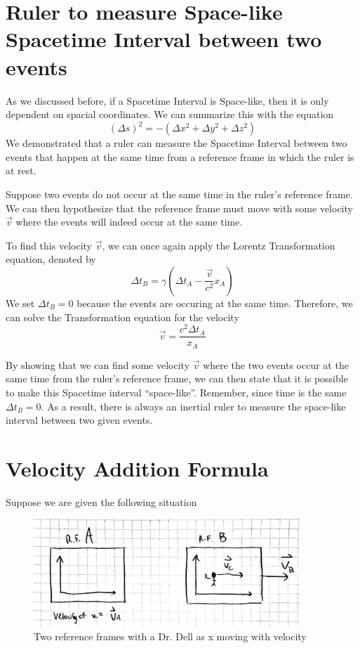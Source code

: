 \documentclass{article}
\begin{document}
\section{Ruler to measure Space-like Spacetime Interval between two events}
As we discussed before, if a Spacetime Interval is Space-like, then it is only dependent on spacial coordinates. We can summarize this with the equation
\[
  (\Delta s)^2 = -(\Delta x^2 + \Delta y^2 + \Delta z^2)
\]
We demonstrated that a ruler can measure the Spacetime Interval between two events that happen at the same time from a reference frame in which the ruler is at rest.

Suppose two events do not occur at the same time in the ruler's reference frame. We can then hypothesize that the reference frame must move with some velocity \(\vec{v}\) where the events will indeed occur at the same time.

To find this velocity \(\vec{v}\), we can once again apply the Lorentz Transformation equation, denoted by
\[
  \Delta t_B = \gamma (\Delta t_A - \frac{\vec{v}}{c^2} x_A)
\]
We set \(\Delta t_B = 0\) because the events are occuring at the same time. Therefore, we can solve the Transformation equation for the velocity
\[
  \vec{v} = \frac{c^2 \Delta t_A}{x_A}
\]

By showing that we can find some velocity \(\vec{v}\) where the two events occur at the same time from the ruler's reference frame, we can then state that it is possible to make this Spacetime interval ``space-like''. Remember, since time is the same \(\Delta t_B = 0\). As a result, there is always an inertial ruler to measure the space-like interval between two given events.
\newpage
\section{Velocity Addition Formula}
Suppose we are given the following situation
\begin{figure}[!htb]
  \centering
  \includegraphics[width=100mm]{velocityaddition}\par
  \caption{Two reference frames with a Dr. Dell as x moving with velocity}
\end{figure}
\end{document}
